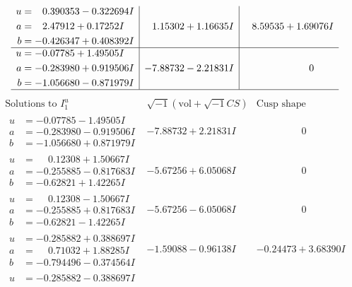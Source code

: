 \documentclass[1p]{elsarticle_modified}
\theoremstyle{definition}
\newcommand{\I}{\sqrt{-1}}
\begin{document}
$$\begin{array}{c|c|c}
\begin{aligned}
u &= \phantom{-}0.390353 - 0.322694 I \\
a &= \phantom{-}2.47912 + 0.17252 I \\
b &= -0.426347 + 0.408392 I\end{aligned}
 & \phantom{-}1.15302 + 1.16635 I & \phantom{-}8.59535 + 1.69076 I \\ \hline\begin{aligned}
u &= -0.07785 + 1.49505 I \\
a &= -0.283980 + 0.919506 I \\
b &= -1.056680 - 0.871979 I\end{aligned}
 & -7.88732 - 2.21831 I & \phantom{-0.000000 } 0\\
 \hline 
 \end{array}$$\newpage$$\begin{array}{c|c|c}  
\text{Solutions to }I^u_{1}& \I (\text{vol} + \sqrt{-1}CS) & \text{Cusp shape}\\
 \hline 
\begin{aligned}
u &= -0.07785 - 1.49505 I \\
a &= -0.283980 - 0.919506 I \\
b &= -1.056680 + 0.871979 I\end{aligned}
 & -7.88732 + 2.21831 I & \phantom{-0.000000 } 0 \\ \hline\begin{aligned}
u &= \phantom{-}0.12308 + 1.50667 I \\
a &= -0.255885 - 0.817683 I \\
b &= -0.62821 + 1.42265 I\end{aligned}
 & -5.67256 + 6.05068 I & \phantom{-0.000000 } 0 \\ \hline\begin{aligned}
u &= \phantom{-}0.12308 - 1.50667 I \\
a &= -0.255885 + 0.817683 I \\
b &= -0.62821 - 1.42265 I\end{aligned}
 & -5.67256 - 6.05068 I & \phantom{-0.000000 } 0 \\ \hline\begin{aligned}
u &= -0.285882 + 0.388697 I \\
a &= \phantom{-}0.71032 + 1.88285 I \\
b &= -0.794496 - 0.374564 I\end{aligned}
 & -1.59088 - 0.96138 I & -0.24473 + 3.68390 I \\ \hline\begin{aligned}
u &= -0.285882 - 0.388697 I \\

\end{aligned}
\end{array}$$
\end{document}
